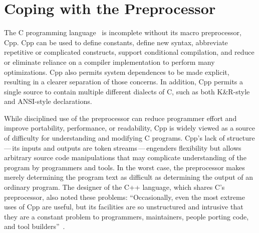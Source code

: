 \documentclass[10pt]{article}
\begin{document}


\bigskip

\section{Coping with the Preprocessor}

The C programming language~\cite{KernighanR88,Harbison91} is
incomplete without its macro preprocessor, Cpp.  Cpp can be used to
define constants, define new syntax, abbreviate repetitive or
complicated constructs, support conditional compilation, and 
reduce or eliminate reliance on a compiler implementation to perform 
many optimizations.
Cpp also permits system dependences to be made explicit, resulting in
a clearer separation of those concerns.  In addition, Cpp permits a single
source to contain multiple different dialects of C, such as both
K\&R-style and ANSI-style declarations.



While disciplined use of the preprocessor can reduce programmer effort
and improve portability, performance, or readability, Cpp is widely
viewed as a source of difficulty for understanding and modifying C
programs.  Cpp's lack of structure\,---\,its inputs and outputs are
token streams\,---\,engenders flexibility but allows arbitrary source
code manipulations that may complicate understanding of the program by
programmers and tools.  In the worst case, the preprocessor makes
merely determining the program text as difficult as determining the
output of an ordinary program.  The designer of the C++ language,
which shares C's preprocessor, also noted these problems:
``Occasionally, even the most extreme uses of Cpp are useful, but its
facilities are so unstructured and intrusive that they are a constant
problem to programmers, maintainers, people porting code, and tool
builders''~\cite[p.~424]{Stroustrup-DesignEvolution}.
\end{document}
